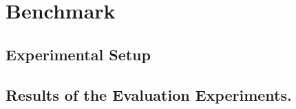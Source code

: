\section{Benchmark}
\label{sec:benchmark}

\subsection{Experimental Setup}



\subsection{Results of the Evaluation Experiments.}